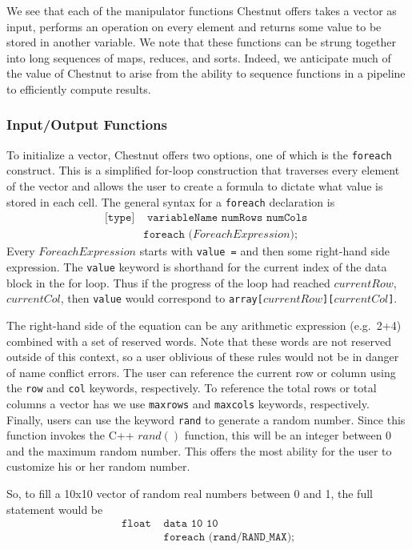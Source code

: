 \documentclass[twocolumn]{article}
\renewcommand{\|}{\origbar} %
\newcommand{\code}[1]{\texttt{#1}}
\begin{document}
We see that each of the manipulator functions Chestnut offers takes a vector as input, performs an operation on every element and returns some value to be stored in another variable. We note that these functions can be strung together into long sequences of maps, reduces, and sorts. Indeed, we anticipate much of the value of Chestnut to arise from the ability to sequence functions in a pipeline to efficiently compute results.

\subsubsection{Input/Output Functions}
\label{sec:iofunctions}

To initialize a vector, Chestnut offers two options, one of which is the \code{foreach} construct. This is a simplified for-loop construction that traverses every element of the vector and allows the user to create a formula to dictate what value is stored in each cell. The general syntax for a \code{foreach} declaration is
\begin{align*}
  \code{[type]}& \code{ variableName numRows numCols } \\ &\code{foreach ($ForeachExpression$);}
\end{align*}
Every $ForeachExpression$ starts with \code{value =} and then some right-hand side expression. The \code{value} keyword is shorthand for the current index of the data block in the for loop. Thus if the progress of the loop had reached $currentRow$, $currentCol$, then \code{value} would correspond to \code{array[$currentRow$][$currentCol$]}.

The right-hand side of the equation can be any arithmetic expression (e.g.\ 2+4) combined with a set of reserved words. Note that these words are not reserved outside of this context, so a user oblivious of these rules would not be in danger of name conflict errors. The user can reference the current row or column using the \code{row} and \code{col} keywords, respectively. To reference the total rows or total columns a vector has we use \code{maxrows} and \code{maxcols} keywords, respectively. Finally, users can use the keyword \code{rand} to generate a random number. Since this function invokes the C++ $rand()$ function, this will be an integer between 0 and the maximum random number. This offers the most ability for the user to customize his or her random number. 

So, to fill a 10x10 vector of random real numbers between 0 and 1, the full statement would be
\begin{align*}
  \code{float } &\code{data 10 10 } \\ &\code{foreach (rand/RAND\_MAX);}
\end{align*}
\end{document}
